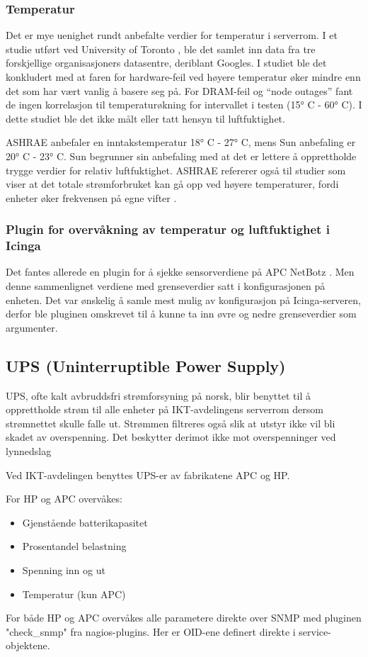 \subsubsection{Temperatur}
Det er mye uenighet rundt anbefalte verdier for temperatur i serverrom. I et studie utført ved University of Toronto \cite{torontopaper}, ble det samlet inn data fra tre forskjellige organisasjoners datasentre, deriblant Googles. I studiet ble det konkludert med at faren for hardware-feil ved høyere temperatur øker mindre enn det som har vært vanlig å basere seg på. For DRAM-feil og ``node outages'' fant de ingen korrelasjon til temperaturøkning for intervallet i testen (15° C - 60° C). I dette studiet ble det ikke målt eller tatt hensyn til luftfuktighet. 

ASHRAE anbefaler en inntakstemperatur 18° C - 27° C, mens Sun anbefaling er 20° C - 23° C. Sun begrunner sin anbefaling med at det er lettere å opprettholde trygge verdier for relativ luftfuktighet. ASHRAE refererer også til studier som viser at det totale strømforbruket kan gå opp ved høyere temperaturer, fordi enheter øker frekvensen på egne vifter \cite{datacentertemp}.

\subsubsection{Plugin for overvåkning av temperatur og luftfuktighet i Icinga}
Det fantes allerede en plugin for å sjekke sensorverdiene på APC NetBotz \cite{checknetbotz}. Men denne sammenlignet verdiene med grenseverdier satt i konfigurasjonen på enheten. Det var ønskelig å samle mest mulig av konfigurasjon på Icinga-serveren, derfor ble pluginen omskrevet til å kunne ta inn øvre og nedre grenseverdier som argumenter.

\subsection{UPS (Uninterruptible Power Supply)}
UPS, ofte kalt avbruddsfri strømforsyning på norsk, blir benyttet til å opprettholde strøm til alle enheter på IKT-avdelingens serverrom dersom strømnettet skulle falle ut. Strømmen filtreres også slik at utstyr ikke vil bli skadet av overspenning. Det beskytter derimot ikke mot overspenninger ved lynnedslag %

Ved IKT-avdelingen benyttes UPS-er av fabrikatene APC og HP.

For HP og APC overvåkes:
\begin{itemize}
 	\item Gjenstående batterikapasitet
	\item Prosentandel belastning
	\item Spenning inn og ut
	\item Temperatur (kun APC)
\end{itemize}

For både HP og APC overvåkes alle parametere direkte over SNMP med pluginen "check\_snmp" fra nagios-plugins. Her er OID-ene definert direkte i service-objektene.
